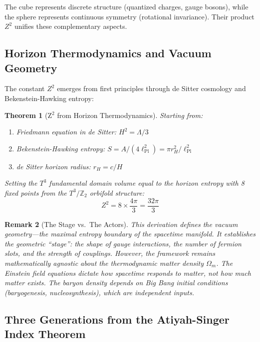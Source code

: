\documentclass[12pt,a4paper]{article}
\newtheorem{theorem}{Theorem}[section]
\newtheorem{remark}[theorem]{Remark}
\begin{document}
The cube represents discrete structure (quantized charges, gauge bosons), while the sphere represents continuous symmetry (rotational invariance). Their product $Z^2$ unifies these complementary aspects.

\subsection{Horizon Thermodynamics and Vacuum Geometry}

The constant $Z^2$ emerges from first principles through de Sitter cosmology and Bekenstein-Hawking entropy:

\begin{theorem}[Z$^2$ from Horizon Thermodynamics]
Starting from:
\begin{enumerate}
    \item Friedmann equation in de Sitter: $H^2 = \Lambda/3$
    \item Bekenstein-Hawking entropy: $S = A/(4\ell_{\text{Pl}}^2) = \pi r_H^2/\ell_{\text{Pl}}^2$
    \item de Sitter horizon radius: $r_H = c/H$
\end{enumerate}
Setting the $T^3$ fundamental domain volume equal to the horizon entropy with 8 fixed points from the $T^3/\mathbb{Z}_2$ orbifold structure:
\begin{equation}
Z^2 = 8 \times \frac{4\pi}{3} = \frac{32\pi}{3}
\end{equation}
\end{theorem}

\begin{remark}[The Stage vs.\ The Actors]
This derivation defines the \textit{vacuum geometry}---the maximal entropy boundary of the spacetime manifold. It establishes the geometric ``stage'': the shape of gauge interactions, the number of fermion slots, and the strength of couplings. However, the framework remains \textit{mathematically agnostic} about the thermodynamic matter density $\Omega_m$. The Einstein field equations dictate how spacetime \textit{responds} to matter, not how much matter exists. The baryon density depends on Big Bang initial conditions (baryogenesis, nucleosynthesis), which are independent inputs.
\end{remark}

\subsection{Three Generations from the Atiyah-Singer Index Theorem}
\end{document}
